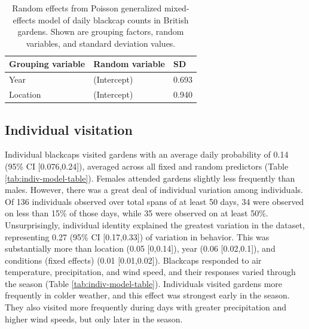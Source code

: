 \documentclass[a4paper, twoside]{templates/ociamthesis}
\begin{document}
\begin{table}[t]

\caption{\label{tab:daily-model-table}Random effects from Poisson generalized mixed-effects model of daily blackcap counts in British gardens. Shown are grouping factors, random variables, and standard deviation values.}
\centering
\begin{tabular}{l|l|l}
\hline
Grouping variable & Random variable & SD\\
\hline
Year & (Intercept) & 0.693\\
\hline
Location & (Intercept) & 0.940\\
\hline
\end{tabular}
\end{table}

\hypertarget{individual-visitation-1}{%
\subsection{Individual visitation}\label{individual-visitation-1}}

Individual blackcaps visited gardens with an average daily probability of 0.14 (95\% CI {[}0.076,0.24{]}), averaged across all fixed and random predictors (Table \ref{tab:indiv-model-table}). Females attended gardens slightly less frequently than males. However, there was a great deal of individual variation among individuals. Of 136 individuals observed over total spans of at least 50 days, 34 were observed on less than 15\% of those days, while 35 were observed on at least 50\%. Unsurprisingly, individual identity explained the greatest variation in the dataset, representing 0.27 (95\% CI {[}0.17,0.33{]}) of variation in behavior. This was substantially more than location (0.05 {[}0,0.14{]}), year (0.06 {[}0.02,0.1{]}), and conditions (fixed effects) (0.01 {[}0.01,0.02{]}). Blackcaps responded to air temperature, precipitation, and wind speed, and their responses varied through the season (Table \ref{tab:indiv-model-table}). Individuals visited gardens more frequently in colder weather, and this effect was strongest early in the season. They also visited more frequently during days with greater precipitation and higher wind speeds, but only later in the season.
\end{document}
